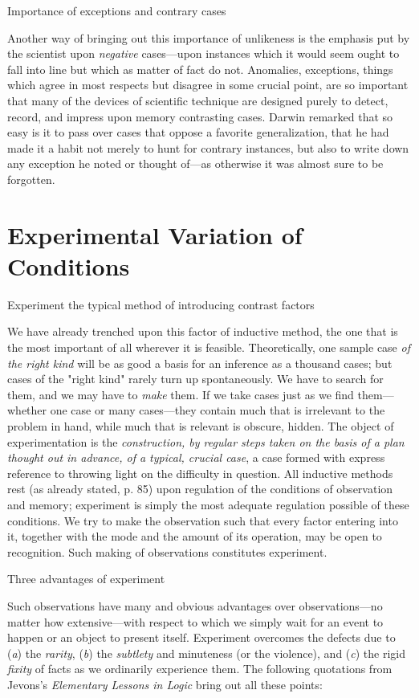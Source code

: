 \documentclass[letterpaper]{book}
\begin{document}
Importance of exceptions and contrary cases

Another way of bringing out this importance of unlikeness is the
emphasis put by the scientist upon \emph{negative} cases---upon
instances which it would seem ought to fall into line but which as
matter of fact do not. Anomalies, exceptions, things which agree in most
respects but disagree in some crucial point, are so important that many
of the devices of scientific technique are designed purely to detect,
record, and impress upon memory contrasting cases. Darwin remarked that
so easy is it to pass over cases that oppose a favorite generalization,
that he had made it a habit not merely to hunt for contrary instances,
but also to write down any exception he noted or thought of---as
otherwise it was almost sure to be
forgotten.

\section{Experimental Variation of Conditions}

Experiment the typical method of introducing contrast factors

We have already trenched upon this factor of inductive method, the one
that is the most important of all wherever it is feasible.
Theoretically, one sample case \emph{of the right kind} will be as good
a basis for an inference as a thousand cases; but cases of the "right
kind" rarely turn up spontaneously. We have to search for them, and we
may have to \emph{make} them. If we take cases just as we find
them---whether one case or many cases---they contain much that is
irrelevant to the problem in hand, while much that is relevant is
obscure, hidden. The object of experimentation is the
\emph{construction, by regular steps taken on the basis of a plan
thought out in advance, of a typical, crucial case}, a case formed with
express reference to throwing light on the difficulty in question. All
inductive methods rest (as already stated, p. 85) upon regulation of the
conditions of observation and memory; experiment is simply the most
adequate regulation possible of these conditions. We try to make the
observation such that every factor entering into it, together with the
mode and the amount of its operation, may be open to recognition. Such
making of observations constitutes experiment.

Three advantages of experiment

Such observations have many and obvious advantages over
observations---no matter how extensive---with respect to which we simply
wait for an event to happen or an object to present itself. Experiment
overcomes the defects due to (\emph{a}) the \emph{rarity}, (\emph{b})
the \emph{subtlety} and minuteness (or the violence), and (\emph{c}) the
rigid \emph{fixity} of facts as we ordinarily experience them. The
following quotations from Jevons's \emph{Elementary Lessons in Logic}
bring out all these points:
\end{document}
